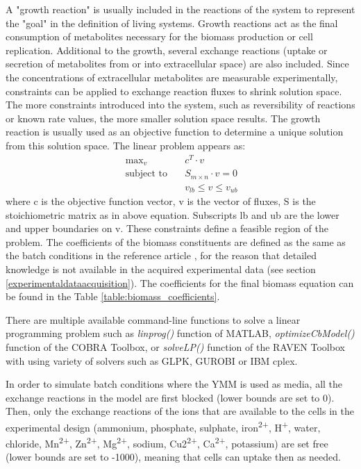 A "growth reaction" is usually included in the reactions of the system to represent the "goal" in the definition of living systems. Growth reactions act as the final consumption of metabolites necessary for the biomass production or cell replication. Additional to the growth, several exchange reactions (uptake or secretion of metabolites from or into extracellular space) are also included. Since the concentrations of extracellular metabolites are measurable experimentally, constraints can be applied to exchange reaction fluxes to shrink solution space. The more constraints introduced into the system, such as reversibility of reactions or known rate values, the more smaller solution space results. The growth reaction is usually used as an objective function to determine a unique solution from this solution space. The linear problem appears as:
\begin{align}
 \ \text{max}_v \quad & c^T \cdot v \\
 \label{eq:fba}
 \ \text{subject to} \quad & S_{m \times n} \cdot v=0 \\
 \ & v_{lb} \leq v \leq v_{ub}
\end{align}
\noindent where c is the objective function vector, v is the vector of fluxes, S is the stoichiometric matrix as in above equation. Subscripts lb and ub are the lower and upper boundaries on v. These constraints define a feasible region of the problem. The coefficients of the biomass constituents are defined as the same as the batch conditions in the reference article \cite{nilsson2016metabolic}, for the reason that detailed knowledge is not available in the acquired experimental data (see section \ref{experimentaldataacquisition}). The coefficients for the final biomass equation can be found in the Table \ref{table:biomass_coefficients}.



There are multiple available command-line functions to solve a linear programming problem such as \emph{linprog()} function of MATLAB, \emph{optimizeCbModel()} function of the COBRA Toolbox, or \emph{solveLP()} function of the RAVEN Toolbox with using variety of solvers such as GLPK, GUROBI or IBM cplex.

In order to simulate batch conditions where the YMM is used as media, all the exchange reactions in the model are first blocked (lower bounds are set to 0). Then, only the exchange reactions of the ions that are available to the cells in the experimental design (ammonium, phosphate, sulphate, iron\textsuperscript{2+}, H\textsuperscript{+}, water, chloride, Mn\textsuperscript{2+}, Zn\textsuperscript{2+}, Mg\textsuperscript{2+}, sodium, Cu2\textsuperscript{2+}, Ca\textsuperscript{2+}, potassium) are set free (lower bounds are set to -1000), meaning that cells can uptake then as needed.


